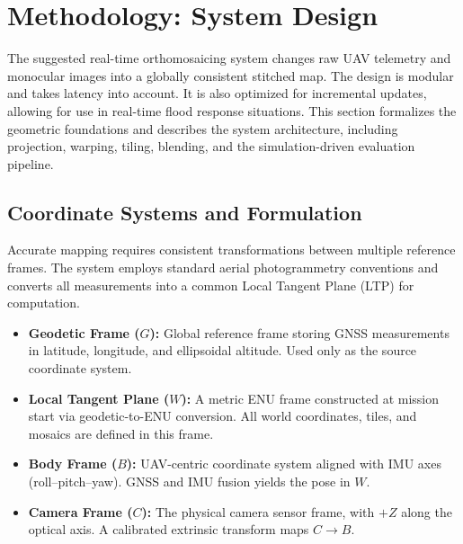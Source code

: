 \documentclass[conference]{IEEEtran}
\begin{document}
        


\section{Methodology: System Design}
The suggested real-time orthomosaicing system changes raw UAV telemetry and monocular images into a globally consistent stitched map. The design is modular and takes latency into account. It is also optimized for incremental updates, allowing for use in real-time flood response situations. This section formalizes the geometric foundations and describes the system architecture, including projection, warping, tiling, blending, and the simulation-driven evaluation pipeline.

\subsection{Coordinate Systems and Formulation}
Accurate mapping requires consistent transformations between multiple reference frames. The system employs standard aerial photogrammetry conventions and converts all measurements into a common Local Tangent Plane (LTP) for computation.

\begin{itemize}
    \item \textbf{Geodetic Frame ($G$):} Global reference frame storing GNSS measurements in latitude, longitude, and ellipsoidal altitude. Used only as the source coordinate system.
    \item \textbf{Local Tangent Plane ($W$):} A metric ENU frame constructed at mission start via geodetic-to-ENU conversion. All world coordinates, tiles, and mosaics are defined in this frame.
    \item \textbf{Body Frame ($B$):} UAV-centric coordinate system aligned with IMU axes (roll--pitch--yaw). GNSS and IMU fusion yields the pose in $W$.
    \item \textbf{Camera Frame ($C$):} The physical camera sensor frame, with $+Z$ along the optical axis. A calibrated extrinsic transform maps $C \rightarrow B$.
\end{itemize}
\end{document}
